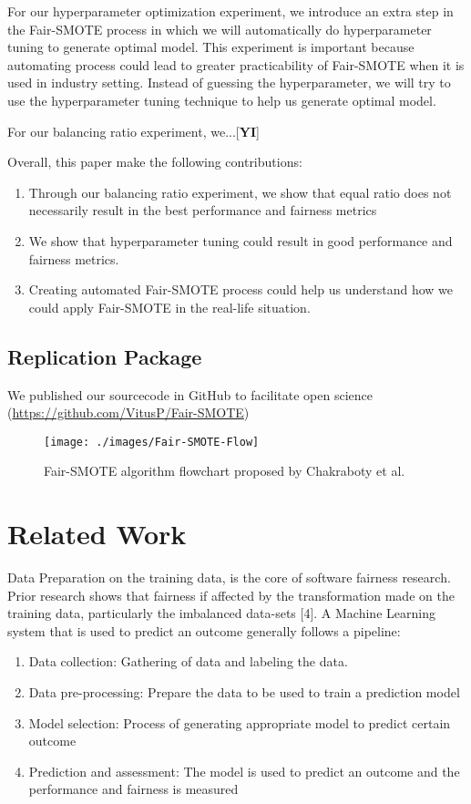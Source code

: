 \documentclass[sigconf]{acmart}
\begin{document}
For our hyperparameter optimization experiment, we introduce an extra step in the Fair-SMOTE process in which we will automatically do hyperparameter tuning to generate optimal model. This experiment is important because automating process could lead to greater practicability of Fair-SMOTE when it is used in industry setting. Instead of guessing the hyperparameter, we will try to use the hyperparameter tuning technique to help us generate optimal model. 

For our balancing ratio experiment, we...[\textbf{YI}]

Overall, this paper make the following contributions:
\begin{enumerate}
    \item Through our balancing ratio experiment, we show that equal ratio does not necessarily result in the best performance and fairness metrics
    \item We show that hyperparameter tuning could result in good performance and fairness metrics.
    \item Creating automated Fair-SMOTE process could help us understand how we could apply Fair-SMOTE in the real-life situation.
\end{enumerate}

\subsection{Replication Package}
We published our sourcecode in GitHub to facilitate open science (\url{https://github.com/VitusP/Fair-SMOTE})

\begin{figure*}[t]
  \centering
  \texttt{[image: ./images/Fair-SMOTE-Flow]}
  \caption{Fair-SMOTE algorithm flowchart proposed by Chakraboty et al.}
\end{figure*}

\section{Related Work}
Data Preparation on the training data, is the core of software fairness research. Prior research shows that fairness if affected by the transformation made on the training data, particularly the imbalanced data-sets [4]. A Machine Learning system that is used to predict an outcome generally follows a pipeline:
\begin{enumerate}
    \item Data collection: Gathering of data and labeling the data.
    \item Data pre-processing: Prepare the data to be used to train a prediction model
    \item Model selection: Process of generating appropriate model to predict certain outcome
    \item Prediction and assessment: The model is used to predict an outcome and the performance and fairness is measured
\end{enumerate}
\end{document}

